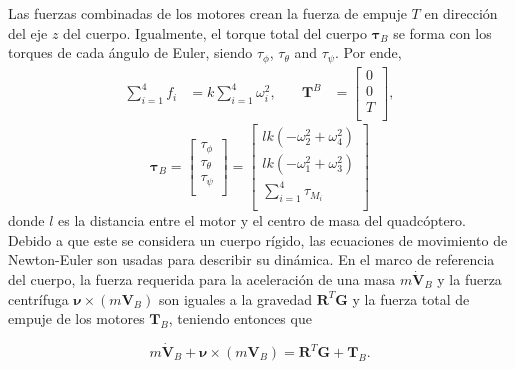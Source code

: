 \documentclass[11pt]{exam}
\begin{document}
        Las fuerzas combinadas de los motores crean la fuerza de empuje $T$ en direcci\'on del eje $z$ del cuerpo. Igualmente, el torque total del cuerpo $\boldsymbol{\tau}_B$ se forma con los torques de cada \'angulo de Euler, siendo $\tau_{\phi}$, $\tau_{\theta}$ and $\tau_{\psi}$. Por ende,
        \begin{align}
            \sum_{i=1}^4 f_i &= k \sum_{i=1}^4 \omega_i^2, &\quad \boldsymbol{T}^B &= 
            \left[{
                \begin{array}{c}
                    0 \\
                    0 \\
                    T \\
                \end{array} 
            }\right],
            \label{eq:7}
        \end{align}
        \begin{equation}
            \boldsymbol{\tau}_B = 
            \left[{
                \begin{array}{c}
                    \tau_\phi \\
                    \tau_\theta \\
                    \tau_\psi \\
                \end{array} 
            }\right] = 
            \left[{
                \begin{array}{c}
                    lk\left(-\omega_2^2 + \omega_4^2 \right) \\
                    lk\left(-\omega_1^2 + \omega_3^2\right) \\
                    \sum_{i = 1}^{4}\tau_{M_i} \\
                \end{array} 
            }\right]
            \label{eq:8}
        \end{equation}
        donde $l$ es la distancia entre el motor y el centro de masa del quadc\'optero. Debido a que este se considera un cuerpo rígido, las ecuaciones de movimiento de Newton-Euler son usadas para describir su dinámica. En el marco de referencia del cuerpo, la fuerza requerida para la aceleraci\'on de una masa $m\dot{\boldsymbol{V}}_B$ y la fuerza centr\'ifuga $\boldsymbol{\nu}\times(m\boldsymbol{V}_B)$ son iguales a la gravedad $\boldsymbol{R}^T\boldsymbol{G}$ y la fuerza total de empuje de los motores $\boldsymbol{T}_B$, teniendo entonces que

        \begin{equation}
            m\dot{\boldsymbol{V}}_B + \boldsymbol{\nu}\times(m\boldsymbol{V}_B) = \boldsymbol{R}^T\boldsymbol{G} + \boldsymbol{T}_B.
        \end{equation}
\end{document}
